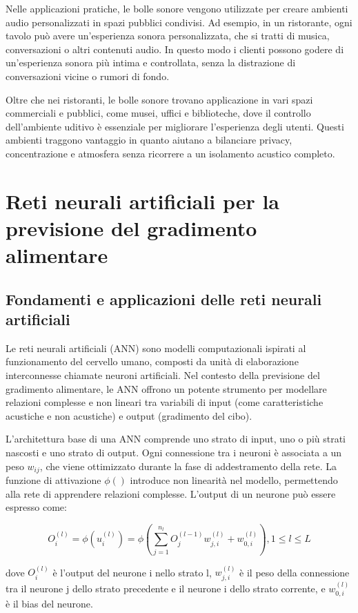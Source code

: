 Nelle applicazioni pratiche, le bolle sonore vengono utilizzate per creare ambienti audio personalizzati in spazi pubblici condivisi. Ad esempio, in un ristorante, ogni tavolo può avere un'esperienza sonora personalizzata, che si tratti di musica, conversazioni o altri contenuti audio. In questo modo i clienti possono godere di un'esperienza sonora più intima e controllata, senza la distrazione di conversazioni vicine o rumori di fondo. 

Oltre che nei ristoranti, le bolle sonore trovano applicazione in vari spazi commerciali e pubblici, come musei, uffici e biblioteche, dove il controllo dell'ambiente uditivo è essenziale per migliorare l'esperienza degli utenti. Questi ambienti traggono vantaggio in quanto aiutano a bilanciare privacy, concentrazione e atmosfera senza ricorrere a un isolamento acustico completo.~\cite{cit-multiaudio}

\section{Reti neurali artificiali per la previsione del gradimento alimentare}

\subsection{Fondamenti e applicazioni delle reti neurali artificiali}
\noindent


Le reti neurali artificiali (ANN) sono modelli computazionali ispirati al funzionamento del cervello umano, composti da unità di elaborazione interconnesse chiamate neuroni artificiali. Nel contesto della previsione del gradimento alimentare, le ANN offrono un potente strumento per modellare relazioni complesse e non lineari tra variabili di input (come caratteristiche acustiche e non acustiche) e output (gradimento del cibo).

L'architettura base di una ANN comprende uno strato di input, uno o più strati nascosti e uno strato di output. Ogni connessione tra i neuroni è associata a un peso $w_{ij}$, che viene ottimizzato durante la fase di addestramento della rete. La funzione di attivazione $\phi()$ introduce non linearità nel modello, permettendo alla rete di apprendere relazioni complesse. L'output di un neurone può essere espresso come:

\[O^{(l)}_i = \phi(u^{(l)}_i) = \phi(\sum_{j=1}^{n_l} O^{(l-1)}_j w^{(l)}_{j,i} + w^{(l)}_{0,i}), 1 \leq l \leq L\]

dove $O^{(l)}_i$ è l'output del neurone i nello strato l, $w^{(l)}_{j,i}$ è il peso della connessione tra il neurone j dello strato precedente e il neurone i dello strato corrente, e $w^{(l)}_{0,i}$ è il bias del neurone.~\cite{cit-FoodResearch}


